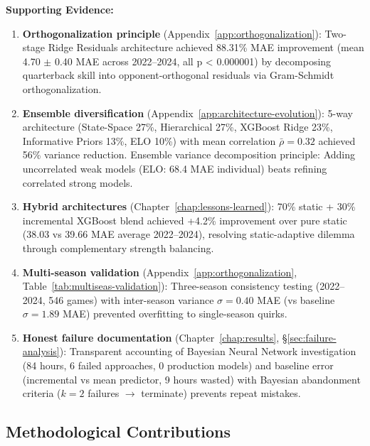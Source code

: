 \textbf{Supporting Evidence:}
\begin{enumerate}[itemsep=2pt,parsep=0pt]
    \item \textbf{Orthogonalization principle} (Appendix~\ref{app:orthogonalization}): Two-stage Ridge Residuals architecture achieved 88.31\% MAE improvement (mean 4.70 $\pm$ 0.40 MAE across 2022--2024, all p < 0.000001) by decomposing quarterback skill into opponent-orthogonal residuals via Gram-Schmidt orthogonalization.

    \item \textbf{Ensemble diversification} (Appendix~\ref{app:architecture-evolution}): 5-way architecture (State-Space 27\%, Hierarchical 27\%, XGBoost Ridge 23\%, Informative Priors 13\%, ELO 10\%) with mean correlation $\bar{\rho} = 0.32$ achieved 56\% variance reduction. Ensemble variance decomposition principle: Adding uncorrelated weak models (ELO: 68.4 MAE individual) beats refining correlated strong models.

    \item \textbf{Hybrid architectures} (Chapter~\ref{chap:lessons-learned}): 70\% static + 30\% incremental XGBoost blend achieved +4.2\% improvement over pure static (38.03 vs 39.66 MAE average 2022--2024), resolving static-adaptive dilemma through complementary strength balancing.

    \item \textbf{Multi-season validation} (Appendix~\ref{app:orthogonalization}, Table~\ref{tab:multiseas-validation}): Three-season consistency testing (2022--2024, 546 games) with inter-season variance $\sigma = 0.40$ MAE (vs baseline $\sigma = 1.89$ MAE) prevented overfitting to single-season quirks.

    \item \textbf{Honest failure documentation} (Chapter~\ref{chap:results}, \S\ref{sec:failure-analysis}): Transparent accounting of Bayesian Neural Network investigation (84 hours, 6 failed approaches, 0 production models) and baseline error (incremental vs mean predictor, 9 hours wasted) with Bayesian abandonment criteria ($k = 2$ failures $\to$ terminate) prevents repeat mistakes.
\end{enumerate}

\subsection{Methodological Contributions}

